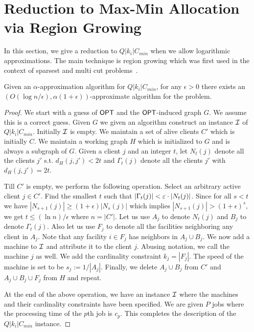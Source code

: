 \newpage 
\section{Reduction to Max-Min Allocation via Region Growing}
In this section, we give a reduction to $Q|k_i|C_{min}$ when we allow logarithmic approximations. The main technique is region growing which was first used in the context of sparsest and multi cut problems~\cite{LeightonRao,GVY}.
\begin{theorem}\label{thm:red}
	Given an $\alpha$-approximation algorithm for $Q|k_i|C_{min}$, for any $\epsilon>0$ there exists an \\ $\left(O(\log n/\epsilon), \alpha(1+\epsilon)\right)$-approximate algorithm for the \mckc problem.
\end{theorem}
\begin{proof}
	We start with a guess of $\mathsf{OPT}$ and the $\mathsf{OPT}$-induced graph $G$. We assume this is a correct guess.
	Given $G$ we given an algorithm construct an instance ${\cal I}$ of $Q|k_i|C_{min}$.
	Initially ${\cal I}$ is empty. We maintain a set of alive clients $C'$ which is initially $C$. We maintain a working graph $H$ which is initialized to $G$ and is always a subgraph of $G$.
	Given a client $j$ and an integer $t$, let $N_t(j)$ denote all the clients $j'$ s.t. $d_H(j,j') < 2t$ and $\Gamma_t(j)$ denote all the clients $j'$ with $d_H(j,j')  = 2t$.\smallskip
	
	
	Till $C'$ is empty, we perform the following operation.
	Select an arbitrary active client $j\in C'$. Find the smallest $t$ such that $|\Gamma_t(j)| < \varepsilon\cdot |N_t(j)|$. Since for all $s < t$ we have $|N_{s+1}(j)|\geq (1+\epsilon)|N_s(j)|$ which implies $|N_{s+1}(j)| > (1+\epsilon)^s$, 
	we get  $t \leq (\ln n)/\epsilon$ where $n=|C'|$. Let us use $A_j$ to denote $N_t(j)$ and $B_j$ to denote $\Gamma_{t}(j)$. Also let us use $F_j$ to denote all the facilities neighboring any client in $A_j$. Note that any facility $i\in F_j$ has neighbors in $A_j \cup B_j$.
	We now add a machine to ${\cal I}$ and attribute it to the client $j$. Abusing notation, we call the machine $j$ as well.
	We add the  cardinality constraint $k_j = |F_j|$. The speed of the machine is set to be $s_j := 1/|A_j|$.
	Finally,  we delete $A_j\cup B_j$ from $C'$ and $A_j\cup B_j\cup F_j$ from $H$ and repeat. \smallskip
	
	At the end of the above operation, we have an instance ${\cal I}$ where the machines and their cardinality constraints have been specified.
	We are given $P$ jobs where the processing time of the $p$th job is $c_p$. This completes the description of the $Q|k_i|C_{min}$ instance.
	

\end{proof}
